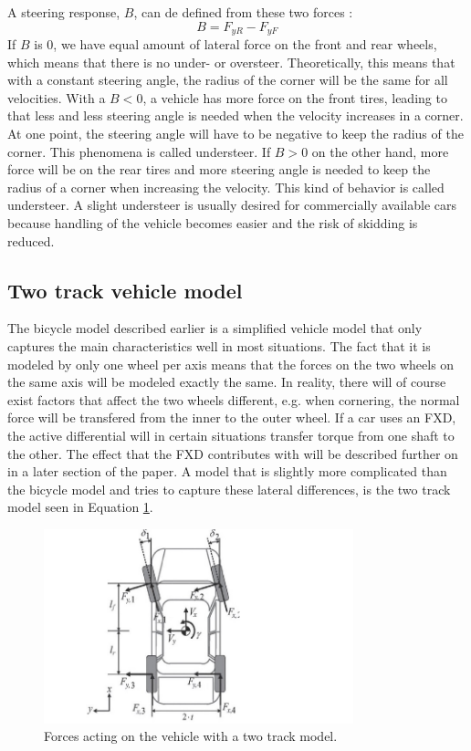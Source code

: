 A steering response, $ B $, can de defined from these two forces \cite{fordonsdynamik99}:
\begin{equation}
	B = F_{yR} - F_{yF}
\end{equation}
If $ B $ is 0, we have equal amount of lateral force on the front and rear wheels, which means that there is no under- or oversteer. Theoretically, this means that with a constant steering angle, the radius of the corner will be the same for all velocities. With a $ B < 0 $, a vehicle has more force on the front tires, leading to that less and less steering angle is needed when the velocity increases in a corner. At one point, the steering angle will have to be negative to keep the radius of the corner. This phenomena is called understeer. If $ B > 0 $ on the other hand, more force will be on the rear tires and more steering angle is needed to keep the radius of a corner when increasing the velocity. This kind of behavior is called understeer. A slight understeer is usually desired for commercially available cars because handling of the vehicle becomes easier and the risk of skidding is reduced.

\subsection{Two track vehicle model}

The bicycle model described earlier is a simplified vehicle model that only captures the main characteristics well in most situations. The fact that it is modeled by only one wheel per axis means that the forces on the two wheels on the same axis will be modeled exactly the same. In reality, there will of course exist factors that affect the two wheels different, e.g. when cornering, the normal force will be transfered from the inner to the outer wheel. If a car uses an FXD, the active differential will in certain situations transfer torque from one shaft to the other. The effect that the FXD contributes with will be described further on in a later section of the paper. A model that is slightly more complicated than the bicycle model and tries to capture these lateral differences, is the two track model seen in Equation \ref{two_track_model}. 

\begin{figure}[h]
	\centering
	\includegraphics[width=0.8\textwidth]{Pictures/two_track_model}
	\caption{Forces acting on the vehicle with a two track model.}
	\label{two_track_model}
\end{figure}


